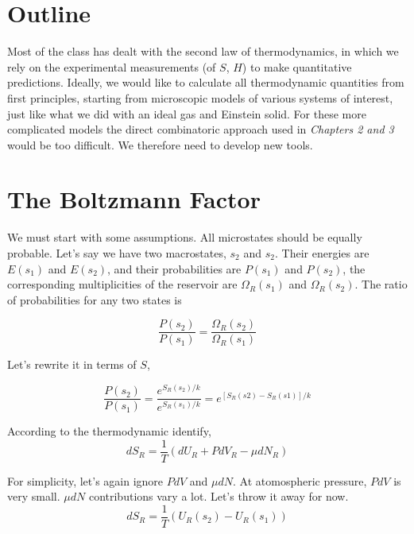 

\section{Outline}
Most of the class has dealt with the second law of thermodynamics, in which we rely on the experimental measurements (of $S$, $H$) to make
quantitative predictions. Ideally, we would like to calculate all thermodynamic quantities from first principles, starting from microscopic models
of various systems of interest, just like what we did with an ideal gas and Einstein solid. For these more complicated models the direct combinatoric approach
used in \textit{Chapters 2 and 3} would be too difficult. We therefore need to develop new tools.

\section{The Boltzmann Factor}

We must start with some assumptions. All microstates should be equally probable. Let's say we have two macrostates, $s_2$ and $s_2$. Their energies are $E(s_1)$ and $E(s_2)$, and their probabilities are $P(s_1)$ and $P(s_2)$, the corresponding multiplicities of the reservoir are
$\Omega_R(s_1)$ and $\Omega_R(s_2)$. The ratio of probabilities for any two states is
 
\begin{equation} \frac{P(s_2)}{P(s_1)} = \frac{\Omega_R(s_2)}{\Omega_R(s_1)} \end{equation}

Let's rewrite it in terms of $S$,

\begin{equation} \frac{P(s_2)}{P(s_1)} = \frac{e^{S_R(s_2)/k}}{e^{S_R(s_1)/k}} = e^{[S_R(s2)-S_R(s1)]/k} \end{equation}

According to the thermodynamic identify,
\begin{equation}
dS_R = \frac{1}{T} (dU_R + PdV_R - \mu dN_R) 
\end{equation}

For simplicity, let's again ignore $PdV$ and $\mu dN$. At atomospheric pressure, $PdV$ is very small. $\mu dN$ contributions vary a lot. Let's throw it away for now.
\begin{equation}
dS_R = \frac{1}{T} (U_R(s_2) - U_R(s_1)) 
\end{equation}


